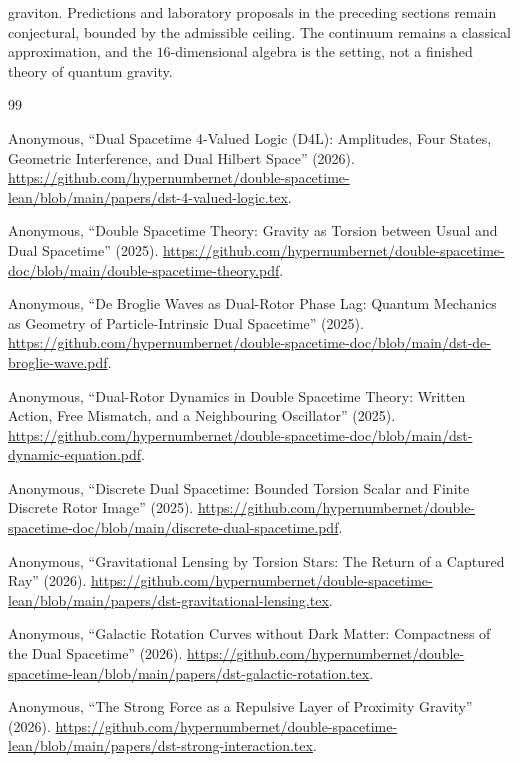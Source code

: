 \documentclass[a4paper]{article}
\begin{document}
graviton. Predictions and laboratory proposals in the preceding sections remain conjectural, bounded by the admissible ceiling. The continuum remains a classical approximation, and the $16$-dimensional algebra is the setting, not a finished theory of quantum gravity.


\begin{thebibliography}{99}
\raggedright

Anonymous,
``Dual Spacetime 4-Valued Logic (D4L): Amplitudes, Four States, Geometric Interference, and Dual Hilbert Space'' (2026).
\url{https://github.com/hypernumbernet/double-spacetime-lean/blob/main/papers/dst-4-valued-logic.tex}.

Anonymous,
``Double Spacetime Theory: Gravity as Torsion between Usual and Dual Spacetime'' (2025).
\url{https://github.com/hypernumbernet/double-spacetime-doc/blob/main/double-spacetime-theory.pdf}.

Anonymous,
``De Broglie Waves as Dual-Rotor Phase Lag: Quantum Mechanics as Geometry of Particle-Intrinsic Dual Spacetime'' (2025).
\url{https://github.com/hypernumbernet/double-spacetime-doc/blob/main/dst-de-broglie-wave.pdf}.

Anonymous,
``Dual-Rotor Dynamics in Double Spacetime Theory: Written Action, Free Mismatch, and a Neighbouring Oscillator'' (2025).
\url{https://github.com/hypernumbernet/double-spacetime-doc/blob/main/dst-dynamic-equation.pdf}.

Anonymous,
``Discrete Dual Spacetime: Bounded Torsion Scalar and Finite Discrete Rotor Image'' (2025).
\url{https://github.com/hypernumbernet/double-spacetime-doc/blob/main/discrete-dual-spacetime.pdf}.

Anonymous,
``Gravitational Lensing by Torsion Stars: The Return of a Captured Ray'' (2026).
\url{https://github.com/hypernumbernet/double-spacetime-lean/blob/main/papers/dst-gravitational-lensing.tex}.

Anonymous,
``Galactic Rotation Curves without Dark Matter: Compactness of the Dual Spacetime'' (2026).
\url{https://github.com/hypernumbernet/double-spacetime-lean/blob/main/papers/dst-galactic-rotation.tex}.

Anonymous,
``The Strong Force as a Repulsive Layer of Proximity Gravity'' (2026).
\url{https://github.com/hypernumbernet/double-spacetime-lean/blob/main/papers/dst-strong-interaction.tex}.


\end{thebibliography}
\end{document}
